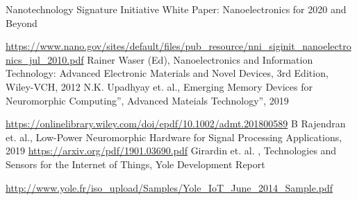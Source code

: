 \begin{multicols}{2}
\begin{thebibliography}{99}
 Nanotechnology Signature Initiative White Paper: Nanoelectronics for 2020 and Beyond 

\url{https://www.nano.gov/sites/default/files/pub_resource/nni_siginit_nanoelectronics_jul_2010.pdf}
 Rainer Waser (Ed), Nanoelectronics and Information Technology: Advanced Electronic Materials and Novel Devices, 3rd Edition, Wiley-VCH, 2012
 N.K. Upadhyay et. al., Emerging Memory Devices for Neuromorphic Computing”, Advanced Mateials Technology”, 2019 

\url{https://onlinelibrary.wiley.com/doi/epdf/10.1002/admt.201800589}
 B Rajendran et. al., Low-Power Neuromorphic Hardware for Signal Processing Applications, 2019  \url{https://arxiv.org/pdf/1901.03690.pdf}
 Girardin et. al. , Technologies and Sensors for the Internet of Things, Yole Development Report 

\url{http://www.yole.fr/iso_upload/Samples/Yole_IoT_June_2014_Sample.pdf}
\end{thebibliography}
\end{multicols}

